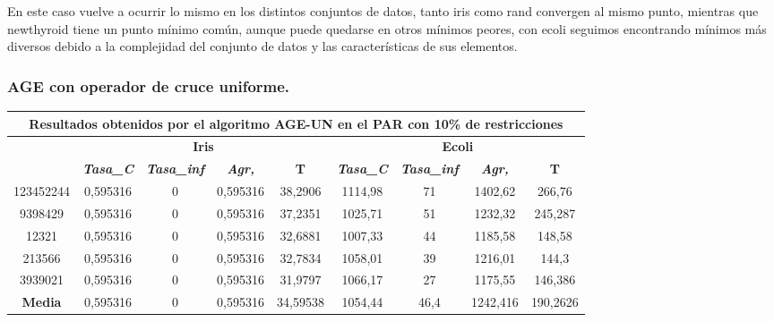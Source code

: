 \documentclass[12pt, spanish]{article}
\begin{document}
En este caso vuelve a ocurrir lo mismo en los distintos conjuntos de datos, tanto iris como rand convergen al mismo punto, mientras que newthyroid tiene un punto mínimo común, aunque puede quedarse en otros mínimos peores, con ecoli seguimos encontrando mínimos más diversos debido a la complejidad del conjunto de datos y las características de sus elementos.

\subsubsection{AGE con operador de cruce uniforme.}

\begin{table}[H]
\footnotesize
\begin{tabular}{|c|c|c|c|c|c|c|c|c|}
\hline
\multicolumn{9}{|c|}{\textbf{Resultados obtenidos por el algoritmo AGE-UN en el PAR con 10\% de restricciones}}                                                                                                   \\ \hline
\multirow{2}{*}{} & \multicolumn{4}{c|}{\textbf{Iris}}                                                            & \multicolumn{4}{c|}{\textbf{Ecoli}}                                                           \\ \cline{2-9} 
                  & \textit{\textbf{Tasa\_C}} & \textit{\textbf{Tasa\_inf}} & \textit{\textbf{Agr,}} & \textbf{T} & \textit{\textbf{Tasa\_C}} & \textit{\textbf{Tasa\_inf}} & \textit{\textbf{Agr,}} & \textbf{T} \\ \hline
123452244         & 0,595316                  & 0                           & 0,595316               & 38,2906    & 1114,98                   & 71                          & 1402,62                & 266,76     \\ \hline
9398429           & 0,595316                  & 0                           & 0,595316               & 37,2351    & 1025,71                   & 51                          & 1232,32                & 245,287    \\ \hline
12321             & 0,595316                  & 0                           & 0,595316               & 32,6881    & 1007,33                   & 44                          & 1185,58                & 148,58     \\ \hline
213566            & 0,595316                  & 0                           & 0,595316               & 32,7834    & 1058,01                   & 39                          & 1216,01                & 144,3      \\ \hline
3939021           & 0,595316                  & 0                           & 0,595316               & 31,9797    & 1066,17                   & 27                          & 1175,55                & 146,386    \\ \hline
\textbf{Media}    & 0,595316                  & 0                           & 0,595316               & 34,59538   & 1054,44                   & 46,4                        & 1242,416               & 190,2626   \\ \hline
\end{tabular}
\end{table}
\end{document}
